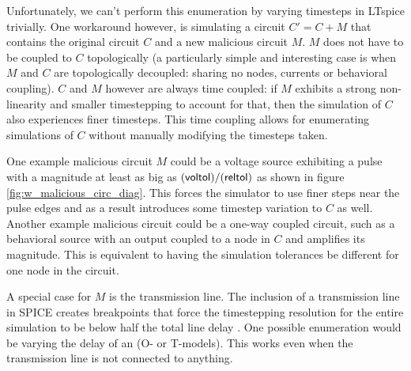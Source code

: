 Unfortunately, we can't perform this enumeration by varying timesteps in LTspice 
trivially. One workaround however, is simulating a circuit $C'=C+M$ that contains
the original circuit $C$ and a new malicious circuit $M$. $M$ does not have to be coupled
to $C$ topologically (a particularly simple and interesting case is when $M$ and $C$ are topologically
decoupled: sharing no nodes, 
currents or behavioral coupling).
$C$ and $M$ however are always time coupled: if $M$ exhibits a strong non-linearity
and smaller timestepping to account for that, then the simulation of $C$ also experiences 
finer timesteps. This time coupling allows
for enumerating simulations of $C$ without manually modifying the timesteps taken.

One example malicious circuit $M$ could be a voltage source exhibiting a pulse 
with a magnitude at least as big as $(\textnormal{\textsf{voltol}})/(\textnormal{\textsf{reltol}})$
as shown in figure \ref{fig:w_malicious_circ_diag}.
This forces the simulator to use finer steps near the pulse edges and as a result
introduces some timestep variation to $C$ as well. Another example malicious circuit 
could be a one-way coupled circuit, such as a behavioral source with an output coupled
to a node in $C$ and amplifies its magnitude. This is equivalent to having the simulation
tolerances be different for one node in the circuit.

A special case for $M$ is the transmission line. The inclusion of a transmission line
in SPICE creates breakpoints that force the timestepping resolution for the entire simulation
to be below half the total line delay \cite{hspice, spice-book}. One possible enumeration would
be varying the delay of an  (O- or T-models). This works even when the transmission line
is not connected to anything.

